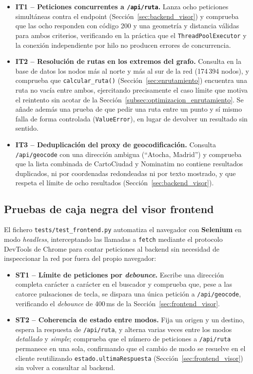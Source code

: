 \begin{itemize}
    \item \textbf{IT1 -- Peticiones concurrentes a \texttt{/api/ruta}.} Lanza ocho peticiones simultáneas contra el endpoint (Sección~\ref{sec:backend_visor}) y comprueba que las ocho responden con código 200 y una geometría y distancia válidas para ambos criterios, verificando en la práctica que el \texttt{ThreadPoolExecutor} y la conexión independiente por hilo no producen errores de concurrencia.
    \item \textbf{IT2 -- Resolución de rutas en los extremos del grafo.} Consulta en la base de datos los nodos más al norte y más al sur de la red (174\,394 nodos), y comprueba que \texttt{calcular\_ruta()} (Sección~\ref{sec:enrutamiento}) encuentra una ruta no vacía entre ambos, ejercitando precisamente el caso límite que motiva el reintento sin acotar de la Sección~\ref{subsec:optimizacion_enrutamiento}. Se añade además una prueba de que pedir una ruta entre un punto y sí mismo falla de forma controlada (\texttt{ValueError}), en lugar de devolver un resultado sin sentido.
    \item \textbf{IT3 -- Deduplicación del proxy de geocodificación.} Consulta \texttt{/api/geocode} con una dirección ambigua (``Atocha, Madrid'') y comprueba que la lista combinada de CartoCiudad y Nominatim no contiene resultados duplicados, ni por coordenadas redondeadas ni por texto mostrado, y que respeta el límite de ocho resultados (Sección~\ref{sec:backend_visor}).
\end{itemize}

\subsection{Pruebas de caja negra del visor frontend}
\label{subsec:pruebas_frontend}

El fichero \texttt{tests/test\_frontend.py} automatiza el navegador con \textbf{Selenium} en modo \textit{headless}, interceptando las llamadas a \texttt{fetch} mediante el protocolo DevTools de Chrome para contar peticiones al backend sin necesidad de inspeccionar la red por fuera del propio navegador:

\begin{itemize}
    \item \textbf{ST1 -- Límite de peticiones por \textit{debounce}.} Escribe una dirección completa carácter a carácter en el buscador y comprueba que, pese a las catorce pulsaciones de tecla, se dispara una única petición a \texttt{/api/geocode}, verificando el \textit{debounce} de 400\,ms de la Sección~\ref{sec:frontend_visor}.
    \item \textbf{ST2 -- Coherencia de estado entre modos.} Fija un origen y un destino, espera la respuesta de \texttt{/api/ruta}, y alterna varias veces entre los modos \textit{detallado} y \textit{simple}; comprueba que el número de peticiones a \texttt{/api/ruta} permanece en una sola, confirmando que el cambio de modo se resuelve en el cliente reutilizando \texttt{estado.ultimaRespuesta} (Sección~\ref{sec:frontend_visor}) sin volver a consultar al backend.
\end{itemize}

